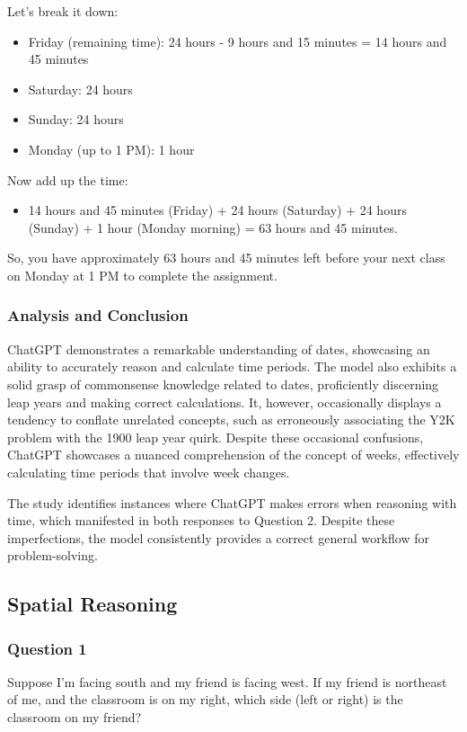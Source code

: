 \documentclass[12pt, a4paper]{article}
\begin{document}
Let's break it down:

\begin{itemize}
    \item Friday (remaining time): 24 hours - 9 hours and 15 minutes = 14 hours and 45 minutes
    \item Saturday: 24 hours
    \item Sunday: 24 hours
    \item Monday (up to 1 PM): 1 hour
\end{itemize}

Now add up the time:

\begin{itemize}
    \item 14 hours and 45 minutes (Friday) + 24 hours (Saturday) + 24 hours (Sunday) + 1 hour (Monday morning) = 63 hours and 45 minutes.
\end{itemize}

So, you have approximately 63 hours and 45 minutes left before your next class on Monday at 1 PM to complete the assignment.

\subsubsection*{Analysis and Conclusion}
ChatGPT demonstrates a remarkable understanding of dates, showcasing an ability to accurately reason and calculate time periods. The model also exhibits a solid grasp of commonsense knowledge related to dates, proficiently discerning leap years and making correct calculations. It, however, occasionally displays a tendency to conflate unrelated concepts, such as erroneously associating the Y2K problem with the 1900 leap year quirk. Despite these occasional confusions, ChatGPT showcases a nuanced comprehension of the concept of weeks, effectively calculating time periods that involve week changes.

The study identifies instances where ChatGPT makes errors when reasoning with time, which manifested in both responses to Question 2. Despite these imperfections, the model consistently provides a correct general workflow for problem-solving.


\subsection*{Spatial Reasoning}
\subsubsection*{Question 1}
Suppose I'm facing south and my friend is facing west. If my friend is northeast of me, and the classroom is on my right, which side (left or right) is the classroom on my friend?
\end{document}
